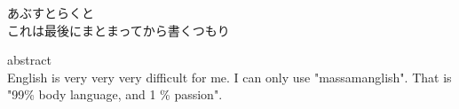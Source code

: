 


\begin{jabstract}

あぶすとらくと\\
これは最後にまとまってから書くつもり

\end{jabstract}



\begin{eabstract}

abstract\\
English is very very very difficult for me.
I can only use "massamanglish".
That is "99\% body language, and 1 \% passion". 

\end{eabstract}
